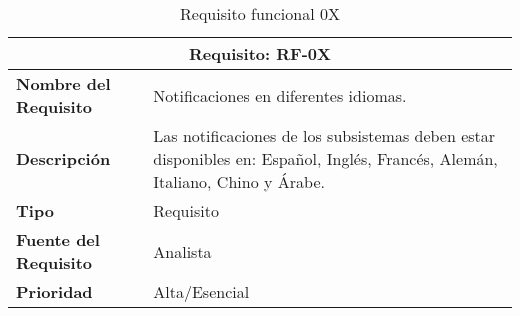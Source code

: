 \begin{table}[H]
\begin{center}
\begin{tabular}{p{} p{7cm}}
\multicolumn{2}{c}{\textbf{Requisito: RF-0X} } \\
\hline \hline
\textbf{Nombre del Requisito} & Notificaciones en diferentes idiomas.\\
\hline
\textbf{Descripción} & Las notificaciones de los subsistemas deben estar disponibles en: Español, Inglés, Francés, Alemán, Italiano, Chino y Árabe.\\
\hline
\textbf{Tipo} & Requisito  \\
\hline
\textbf{Fuente del Requisito} & Analista  \\
\hline
\textbf{Prioridad} & Alta/Esencial \\ \hline
\end{tabular}
\caption{Requisito funcional 0X}
\label{tab:personal}
\end{center}
\end{table}
